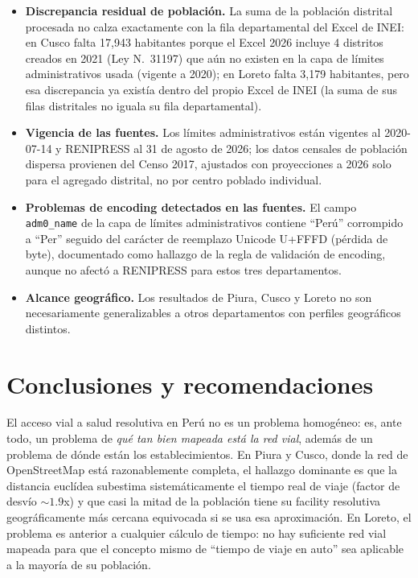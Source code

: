 \documentclass[11pt]{article}
\begin{document}
\begin{itemize}
  la ciudad, no la variaci\'on intraurbana, pero pierde granularidad
  dentro de las ciudades grandes.
  \item \textbf{Discrepancia residual de poblaci\'on.} La suma de la
  poblaci\'on distrital procesada no calza exactamente con la fila
  departamental del Excel de INEI: en Cusco falta 17{,}943 habitantes
  porque el Excel 2026 incluye 4 distritos creados en 2021 (Ley
  N.\textdegree\ 31197) que a\'un no existen en la capa de l\'imites
  administrativos usada (vigente a 2020); en Loreto falta 3{,}179
  habitantes, pero esa discrepancia ya exist\'ia dentro del propio
  Excel de INEI (la suma de sus filas distritales no iguala su fila
  departamental).
  \item \textbf{Vigencia de las fuentes.} Los l\'imites administrativos
  est\'an vigentes al 2020-07-14 y RENIPRESS al 31 de agosto de 2026;
  los datos censales de poblaci\'on dispersa provienen del Censo 2017,
  ajustados con proyecciones a 2026 solo para el agregado distrital, no
  por centro poblado individual.
  \item \textbf{Problemas de encoding detectados en las fuentes.} El
  campo \texttt{adm0\_name} de la capa de l\'imites administrativos
  contiene ``Per\'u'' corrompido a ``Per'' seguido del car\'acter de
  reemplazo Unicode U+FFFD (p\'erdida de byte),
  documentado como hallazgo de la regla de validaci\'on de encoding,
  aunque no afect\'o a RENIPRESS para estos tres departamentos.
  \item \textbf{Alcance geogr\'afico.} Los resultados de Piura, Cusco y
  Loreto no son necesariamente generalizables a otros departamentos con
  perfiles geogr\'aficos distintos.
\end{itemize}

\section{Conclusiones y recomendaciones}

El acceso vial a salud resolutiva en Per\'u no es un problema homog\'eneo:
es, ante todo, un problema de \emph{qu\'e tan bien mapeada est\'a la red
vial}, adem\'as de un problema de d\'onde est\'an los establecimientos. En
Piura y Cusco, donde la red de OpenStreetMap est\'a razonablemente
completa, el hallazgo dominante es que la distancia eucl\'idea subestima
sistem\'aticamente el tiempo real de viaje (factor de desv\'io ${\sim}1.9$x)
y que casi la mitad de la poblaci\'on tiene su facility resolutiva
geogr\'aficamente m\'as cercana equivocada si se usa esa aproximaci\'on. En
Loreto, el problema es anterior a cualquier c\'alculo de tiempo: no hay
suficiente red vial mapeada para que el concepto mismo de ``tiempo de
viaje en auto'' sea aplicable a la mayor\'ia de su poblaci\'on.
\end{document}
